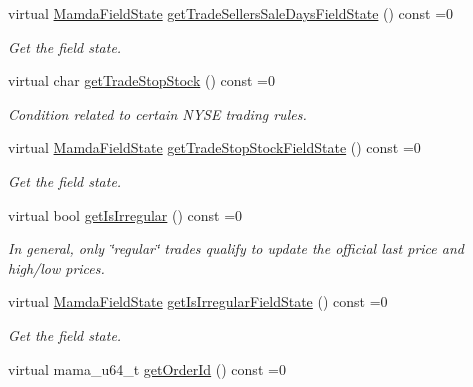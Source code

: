 \begin{CompactItemize}
virtual \hyperlink{namespaceWombat_93aac974f2ab713554fd12a1fa3b7d2a}{Mamda\-Field\-State} \hyperlink{classWombat_1_1MamdaTradePossiblyDuplicate_dadaa92d7ee001dd310ba0bb411011e8}{get\-Trade\-Sellers\-Sale\-Days\-Field\-State} () const =0
\begin{CompactList}\small\item\em Get the field state. \item\end{CompactList}\item 
virtual char \hyperlink{classWombat_1_1MamdaTradePossiblyDuplicate_ee52eadfef02fa09483632232a943503}{get\-Trade\-Stop\-Stock} () const =0
\begin{CompactList}\small\item\em Condition related to certain NYSE trading rules. \item\end{CompactList}\item 
virtual \hyperlink{namespaceWombat_93aac974f2ab713554fd12a1fa3b7d2a}{Mamda\-Field\-State} \hyperlink{classWombat_1_1MamdaTradePossiblyDuplicate_5ab03194fc902b4dabda0ad0291cc7ff}{get\-Trade\-Stop\-Stock\-Field\-State} () const =0
\begin{CompactList}\small\item\em Get the field state. \item\end{CompactList}\item 
virtual bool \hyperlink{classWombat_1_1MamdaTradePossiblyDuplicate_63462036a60908fbbaf8d6a462332c35}{get\-Is\-Irregular} () const =0
\begin{CompactList}\small\item\em In general, only \char`\"{}regular\char`\"{} trades qualify to update the official last price and high/low prices. \item\end{CompactList}\item 
virtual \hyperlink{namespaceWombat_93aac974f2ab713554fd12a1fa3b7d2a}{Mamda\-Field\-State} \hyperlink{classWombat_1_1MamdaTradePossiblyDuplicate_d71ae9976fe6a0f141fb1a9d2cd60b8d}{get\-Is\-Irregular\-Field\-State} () const =0
\begin{CompactList}\small\item\em Get the field state. \item\end{CompactList}\item 
virtual mama\_\-u64\_\-t \hyperlink{classWombat_1_1MamdaTradePossiblyDuplicate_8df1610925e943b7d585993e0f4192a9}{get\-Order\-Id} () const =0

\end{CompactItemize}
